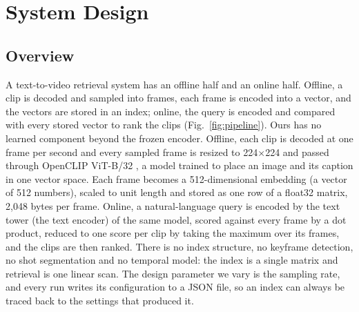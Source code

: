 \documentclass[journal]{IEEEtran}
\begin{document}
\section{System Design}\label{sec:design}

\subsection{Overview}
A text-to-video retrieval system has an offline half and an online half. Offline, a clip is
decoded and sampled into frames, each frame is encoded into a vector, and the vectors are stored
in an index; online, the query is encoded and compared with every stored vector to rank the clips
(Fig.~\ref{fig:pipeline}). Ours has no learned component beyond the frozen encoder. Offline, each
clip is decoded at one frame per second and every sampled frame is resized to 224$\times$224 and
passed through OpenCLIP
ViT-B/32 \cite{cherti2023reproducible}, a model trained to place an image and its caption in one
vector space. Each frame becomes a 512-dimensional embedding (a vector of 512 numbers), scaled to
unit length and stored as one row of a float32 matrix, 2{,}048 bytes per frame. Online, a
natural-language query is encoded by the text tower (the text encoder) of the same model, scored
against every
frame by a dot product, reduced to one score per clip by taking the maximum over its frames,
and the clips are then ranked. There is no index structure, no keyframe detection, no shot
segmentation and no temporal model: the index is a single matrix and retrieval is one linear
scan. The design parameter we vary is the sampling rate, and every run writes its
configuration to a JSON file, so an index can always be traced back to the settings that
produced it.
\end{document}
